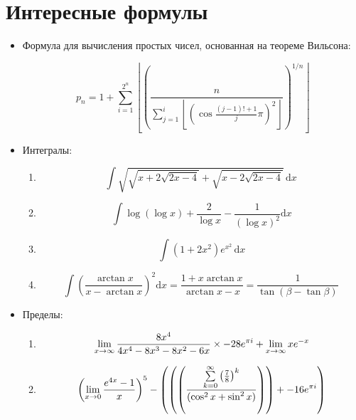 \documentclass[a4paper,12pt]{article}
\theoremstyle{plain}
\theoremstyle{definition}
\begin{document}
\newpage
	\section{{Интересные формулы}}
	
	\begin{itemize}
    \item Формула для вычисления простых чисел, основанная на теореме Вильсона:
    
    $$p_{n}=1+\sum _{i=1}^{2^{n}}\left\lfloor \left({\frac {n}{\sum _{j=1}^{i}\left\lfloor \left(\cos {\frac {(j-1)!+1}{j}}\pi \right)^{2}\right\rfloor }}\right)^{1/n}\right\rfloor$$
    
    \item Интегралы:
    \begin{enumerate}
        \item  $$ \int \sqrt{ \sqrt{ x + 2\sqrt{2x-4} } +  \sqrt{ x - 2\sqrt{2x-4} } } \,\mathrm{d}x \,$$
        \item $$ \int \log( \log x) + \frac{2}{\log x}  - \frac{1}{(\log x)^2} \mathrm{d}x$$
        \item $$ \int (1 + 2x^2) e^{x^2}\,  \mathrm{d}x$$ 
        \item $$\int \left( \frac{\arctan x}{x - \arctan x}\right)^2 \mathrm{d}x
         = \frac{1 + x \arctan x}{\arctan x - x} 
	 = \frac{1}{\tan (\beta - \tan \beta)}\,$$
    \end{enumerate}
    \item Пределы:
    \begin{enumerate}
        \item  $${\lim_{x \to \infty}{{ 8x^{4}  } \over {{ 4x^{4} - 8x^{3} - 8x^{2} - 6x  }}}} \times {{-28e^{\pi i}}} + {\lim_{x \to \infty}{xe^{-x}}}$$
        \item $$\left({{\lim_{x \to 0}{ {e^{4x} - 1} \over {x} }}}\right)^{5} - \left({{ \left({\left({{\sum\limits_{k=0}^\infty {\left({7 \over {8}}\right)^{k}}} \over {(\cos^2x + \sin^2x)}}\right)}\right) + {{-16e^{\pi i}}}}}\right)$$
    \end{enumerate}
    
\end{itemize}
     
     
     

 \newpage
    
\end{document}
